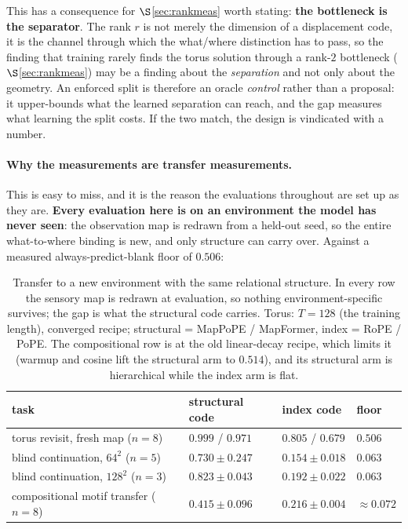 \documentclass[11pt]{article}
\begin{document}
This has a consequence for $\S$\ref{sec:rankmeas} worth stating: \textbf{the
bottleneck is the separator}. The rank $r$ is not merely the dimension of a
displacement code, it is the channel through which the what/where distinction has to
pass, so the finding that training rarely finds the torus solution through a
rank-$2$ bottleneck ($\S$\ref{sec:rankmeas}) may be a finding about the \emph{separation} and not
only about the geometry.
An enforced split is therefore an oracle \emph{control} rather than a proposal: it
upper-bounds what the learned separation can reach, and the gap measures what
learning the split costs. If the two match, the design is vindicated with a number.

\paragraph{Why the measurements are transfer measurements.} This is easy to miss,
and it is the reason the evaluations throughout are set up as they are. \textbf{Every
evaluation here is on an environment the model has never seen}: the observation map
is redrawn from a held-out seed, so the entire what-to-where binding is new, and
only structure can carry over. Against a measured always-predict-blank floor of
$0.506$:

\begin{table}[htbp]\centering\small
\caption{Transfer to a new environment with the same relational structure. In every row the sensory map is redrawn at evaluation, so nothing environment-specific survives; the gap is what the structural code carries. Torus: $T{=}128$ (the training length), converged recipe; structural = MapPoPE / MapFormer, index = RoPE / PoPE. The compositional row is at the old linear-decay recipe, which limits it (warmup and cosine lift the structural arm to $0.514$), and its structural arm is hierarchical while the index arm is flat.}
\label{tab:transfer}
\begin{tabular}{@{}p{4.6cm}p{3.4cm}p{3.0cm}p{3.2cm}@{}}
\toprule
task & structural code & index code & floor \\
\midrule
torus revisit, fresh map ($n{=}8$) & $\mathbf{0.999}$ / $0.971$ & $0.805$ / $0.679$ & $0.506$ \\[2pt]
blind continuation, $64^2$ ($n{=}5$) & $\mathbf{0.730 \pm 0.247}$ & $0.154 \pm 0.018$ & $0.063$ \\[2pt]
blind continuation, $128^2$ ($n{=}3$) & $\mathbf{0.823 \pm 0.043}$ & $0.192 \pm 0.022$ & $0.063$ \\[2pt]
compositional motif transfer ($n{=}8$) & $\mathbf{0.415 \pm 0.096}$ & $0.216 \pm 0.004$ & $\approx 0.072$ \\
\bottomrule
\end{tabular}
\end{table}
\end{document}
